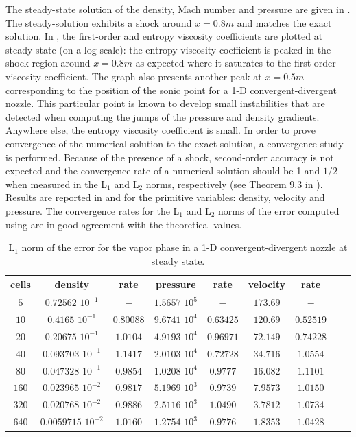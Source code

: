 %
The steady-state solution of the density, Mach number and pressure are given in . The steady-solution exhibits a shock around $x=0.8m$ and matches the exact solution. In , the first-order and entropy viscosity coefficients are plotted at steady-state (on a log scale): the entropy viscosity coefficient is peaked in the shock region around $x=0.8m$ as expected where it saturates to the first-order viscosity coefficient. The graph also presents another peak at $x=0.5m$  corresponding to the position of the sonic point for a 1-D convergent-divergent nozzle. This particular point is known to develop small instabilities that are detected when computing the jumps of the pressure and density gradients. Anywhere else, the entropy  viscosity coefficient is small. In order to prove convergence of the numerical solution to the exact solution, a convergence study is performed. Because of the presence of a shock, second-order accuracy is not expected and the convergence rate of a numerical solution should be 1 and $1/2$ when measured in the L$_1$ and L$_2$ norms, respectively (see Theorem 9.3 in \cite{convergence_book}). Results are reported in  and  for the primitive variables: density, velocity and pressure. The convergence rates for the L$_1$ and L$_2$ norms of the error computed using  are in good agreement with the theoretical values.
%
\begin{table}[!htbp]
\begin{center}
 \caption{\label{tbl:l1_norm_vap} L$_1$ norm of the error for the vapor phase in a 1-D convergent-divergent nozzle at steady state.}
 \begin{tabular}{|c|c|c|c|c|c|c|c|c|}
 \hline
cells & density              & rate      & pressure          & rate      & velocity & rate      \\ \hline
$5$  & $0.72562$   $10^{-1}$ & $-$       & $1.5657$ $10^{5}$ & $-$       & $173.69$ & $-$       \\ \hline
$10$ & $0.4165$    $10^{-1}$ & $0.80088$ & $9.6741$ $10^{4}$ & $0.63425$ & $120.69$ & $0.52519$ \\ \hline
$20$ & $0.20675$   $10^{-1}$ & $1.0104$  & $4.9193$ $10^{4}$ & $0.96971$ & $72.149$ & $0.74228$ \\ \hline
$40$ & $0.093703$  $10^{-1}$ & $1.1417$  & $2.0103$ $10^{4}$ & $0.72728$ & $34.716$ & $1.0554$  \\ \hline
$80$ & $0.047328$  $10^{-1}$ & $0.9854$  & $1.0208$ $10^{4}$ & $0.9777$  & $16.082$ & $1.1101$  \\ \hline
$160$& $0.023965$  $10^{-2}$ & $0.9817$  & $5.1969$ $10^{3}$ & $0.9739$  & $7.9573$ & $1.0150$  \\ \hline
$320$& $0.020768$  $10^{-2}$ & $0.9886$  & $2.5116$ $10^{3}$ & $1.0490$  & $3.7812$ & $1.0734$  \\ \hline
$640$& $0.0059715$ $10^{-2}$ & $1.0160$  & $1.2754$ $10^{3}$ & $0.9776$  & $1.8353$ & $1.0428$  \\ \hline
\end{tabular}
\end{center}
\nonumber
\end{table}
